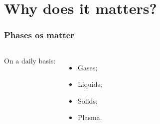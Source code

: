 \section{Why does it matters?}

\begin{frame}
    \frametitle{Phases os matter}

    \begin{columns}

    On a daily basis:
    \begin{itemize}
        \item Gases;
        \item Liquids;
        \item Solids;
        \item Plasma.
    \end{itemize}



    \end{columns}

\end{frame}
